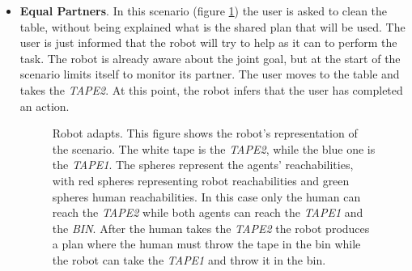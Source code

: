 \begin{itemize}
  \item
\textbf{Equal Partners}.
In this scenario (figure \ref{fig:coworker_results-scenario1}) the user is asked to clean the table, without being explained what is the shared plan that will be used. The user is just informed that
the robot will try to help as it can to perform the task. The robot is already aware about the joint goal, but at the start of the scenario limits itself to monitor its partner. The user moves to the table and takes the \textit{TAPE2}. At this point, the robot infers that the user
has completed an action.
\begin{figure}
  \caption[Robot coworker experiment 1]{Robot adapts. This figure shows the robot's representation of the scenario. The white tape is the \textit{TAPE2}, while the blue
    one is the \textit{TAPE1}. The spheres represent the agents'
    reachabilities, with red spheres representing robot reachabilities
    and green spheres human reachabilities. In this case only the human
  can reach the \textit{TAPE2} while both agents can reach the \textit{TAPE1}
and the \textit{BIN}. After the human takes the \textit{TAPE2} the
robot produces a plan where the human must throw the tape in the
bin while the robot can take the \textit{TAPE1} and throw it in the
bin.
}
\centering
  \label{fig:coworker_results-scenario1}
\end{figure}


\end{itemize}
